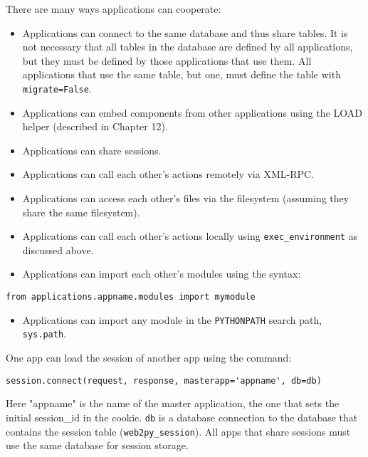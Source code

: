 \documentclass[justified,sixbynine,notoc]{tufte-book}
\def\ft{\small\tt}
\def\inxx#1{\index{#1}}
\begin{document}
\begin{fullwidth}
\inxx{cooperation}

There are many ways applications can cooperate:
\begin{itemize}
\item Applications can connect to the same database and thus share tables. It is not necessary that all tables in the database are defined by all applications, but they must be defined by those applications that use them. All applications that use the same table, but one, must define the table with {\ft migrate=False}.

\item Applications can embed components from other applications using the LOAD helper (described in Chapter 12).

\item Applications can share sessions.

\item Applications can call each other's actions remotely via XML-RPC.

\item Applications can access each other's files via the filesystem (assuming they share the same filesystem).

\item Applications can call each other's actions locally using {\ft exec\_environment} as discussed above.

\item Applications can import each other's modules using the syntax:
\end{itemize}
\begin{lstlisting}
from applications.appname.modules import mymodule
\end{lstlisting}

\begin{itemize}
\item Applications can import any module in the {\ft PYTHONPATH} search path, {\ft sys.path}.
\end{itemize}

One app can load the session of another app using the command:

\begin{lstlisting}
session.connect(request, response, masterapp='appname', db=db)
\end{lstlisting}

Here "appname" is the name of the master application, the one that sets the initial session\_id in the cookie. {\ft db} is a database connection to the database that contains the session table ({\ft web2py\_session}). All apps that share sessions must use the same database for session storage.


\end{fullwidth}
\end{document}
